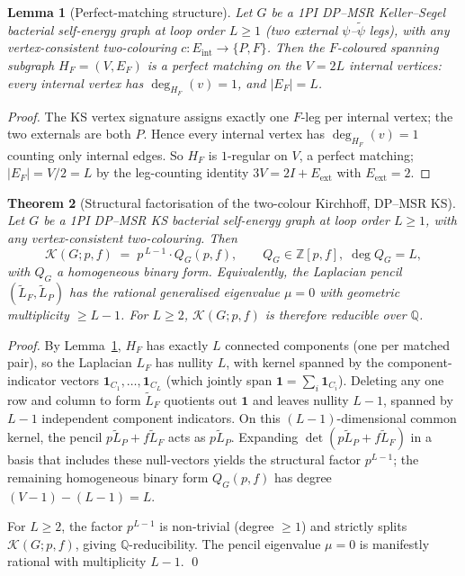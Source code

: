 \documentclass[11pt,a4paper]{article}
\theoremstyle{plain}
\newtheorem{theorem}{Theorem}
\newtheorem{lemma}[theorem]{Lemma}
\begin{document}
\begin{lemma}[Perfect-matching structure]
\label{lem:matching}
Let $G$ be a 1PI DP--MSR Keller--Segel bacterial self-energy
graph at loop order $L \geq 1$ (two external $\psi$--$\tilde\psi$
legs), with any vertex-consistent two-colouring
$c: E_{\mathrm{int}} \to \{P, F\}$.  Then the $F$-coloured
spanning subgraph $H_F = (V, E_F)$ is a \emph{perfect matching}
on the $V = 2L$ internal vertices: every internal vertex has
$\deg_{H_F}(v) = 1$, and $|E_F| = L$.
\end{lemma}

\begin{proof}
The KS vertex signature assigns exactly one $F$-leg per internal
vertex; the two externals are both $P$.  Hence every internal
vertex has $\deg_{H_F}(v) = 1$ counting only internal edges.  So
$H_F$ is $1$-regular on $V$, a perfect matching; $|E_F| = V/2 = L$
by the leg-counting identity $3V = 2I + E_{\mathrm{ext}}$ with
$E_{\mathrm{ext}} = 2$.
\end{proof}

\begin{theorem}[Structural factorisation of the two-colour Kirchhoff, DP--MSR KS]
\label{thm:ksfactor}
Let $G$ be a 1PI DP--MSR KS bacterial self-energy graph at loop
order $L \geq 1$, with any vertex-consistent two-colouring.  Then
\begin{equation}\label{eq:pLfactor}
  \mathcal{K}(G; p, f)
  \;=\; p^{\,L-1}\cdot Q_G(p, f),
  \qquad
  Q_G \in \mathbb{Z}[p, f],\;\deg Q_G = L,
\end{equation}
with $Q_G$ a homogeneous binary form.  Equivalently, the
Laplacian pencil $(\widetilde L_F, \widetilde L_P)$ has the rational
generalised eigenvalue $\mu = 0$ with geometric multiplicity
$\geq L - 1$.  For $L \geq 2$, $\mathcal{K}(G; p, f)$ is therefore
reducible over $\mathbb{Q}$.
\end{theorem}

\begin{proof}
By Lemma~\ref{lem:matching}, $H_F$ has exactly $L$ connected
components (one per matched pair), so the Laplacian $L_F$ has
nullity $L$, with kernel spanned by the component-indicator
vectors $\mathbf 1_{C_1}, \ldots, \mathbf 1_{C_L}$ (which jointly
span $\mathbf 1 = \sum_i \mathbf 1_{C_i}$).  Deleting any one row
and column to form $\widetilde L_F$ quotients out $\mathbf 1$ and
leaves nullity $L - 1$, spanned by $L - 1$ independent
component indicators.  On this $(L-1)$-dimensional common kernel,
the pencil $p \widetilde L_P + f \widetilde L_F$ acts as $p \widetilde L_P$.
Expanding $\det(p \widetilde L_P + f \widetilde L_F)$ in a basis that
includes these null-vectors yields the structural factor $p^{L-1}$;
the remaining homogeneous binary form $Q_G(p, f)$ has degree
$(V - 1) - (L - 1) = L$.

For $L \geq 2$, the factor $p^{L-1}$ is non-trivial (degree
$\geq 1$) and strictly splits $\mathcal{K}(G; p, f)$, giving
$\mathbb{Q}$-reducibility.  The pencil eigenvalue $\mu = 0$ is
manifestly rational with multiplicity $L - 1$.  \qed
\end{proof}
\end{document}

